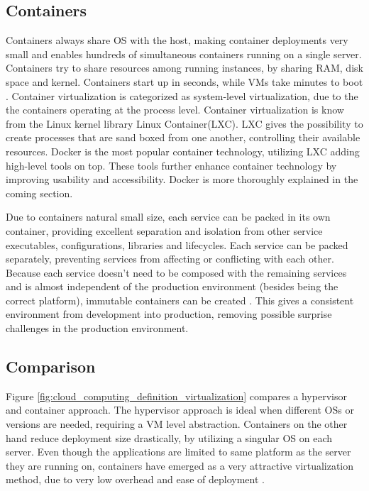\subsection{Containers}
Containers always share OS with the host, making container deployments very small and enables hundreds of simultaneous containers running on a single server. Containers try to share resources among running instances, by sharing RAM, disk space and kernel. Containers start up in seconds, while VMs take minutes to boot \cite{dockerFAQ}. Container virtualization is categorized as system-level virtualization, due to the the containers operating at the process level. Container virtualization is know from the Linux kernel library Linux Container(LXC). LXC gives the possibility to create processes that are sand boxed from one another, controlling their available resources. Docker is the most popular container technology, utilizing LXC adding high-level tools on top. These tools further enhance container technology by improving usability and accessibility. Docker is more thoroughly explained in the coming section. 

Due to containers natural small size, each service can be packed in its own container, providing excellent separation and isolation from other service executables, configurations, libraries and lifecycles. Each service can be packed separately, preventing services from affecting or conflicting with each other. Because each service doesn't need to be composed with the remaining services and is almost independent of the production environment (besides being the correct platform), immutable containers can be created \cite{kubernetes_what_is}. This gives a consistent environment from development into production, removing possible surprise challenges in the production environment.


\subsection{Comparison}
Figure \ref{fig:cloud_computing_definition_virtualization} compares a hypervisor and container approach. The hypervisor approach is ideal when different OSs or versions are needed, requiring a VM level abstraction\cite{bernstein2014containers}. Containers on the other hand reduce deployment size drastically, by utilizing a singular OS on each server. Even though the applications are limited to same platform as the server they are running on, containers have emerged as a very attractive virtualization method, due to very low overhead and ease of deployment \cite{fink2014docker}.

